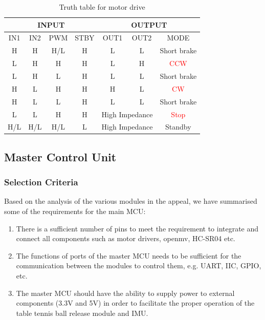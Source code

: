 \documentclass[12pt, a4paper, oneside]{report}
\begin{document}
\begin{table}[H]
    \centering
    \begin{tabular}{|c|c|c|c|c|c|c|}
    \hline
         \multicolumn{4}{|c|}{INPUT} & \multicolumn{3}{|c|}{OUTPUT} \\ \hline
        IN1 & IN2 & PWM & STBY & OUT1 & OUT2 & MODE \\ \hline
        H & H & H/L & H & L & L & Short brake \\ \hline
        L & H & H & H & L & H & \textcolor{red}{CCW}\\ \hline
        L & H & L & H & L & L & Short brake \\ \hline
        H & L & H & H & H & L & \textcolor{red}{CW} \\ \hline
        H & L & L & H & L & L & Short brake \\ \hline
        L & L & H & H & \multicolumn{2}{|c|}{High Impedance} & \textcolor{red}{Stop} \\ \hline
        H/L & H/L & H/L & L & \multicolumn{2}{|c|}{High Impedance}& Standby \\ \hline
    \end{tabular}
    \caption{Truth table for motor drive \cite{zzs1}}
    \label{tab:mt3}
\end{table}


\subsection{Master Control Unit}
\subsubsection{Selection Criteria}
Based on the analysis of the various modules in the appeal, we have summarised some of the requirements for the main MCU:
 \begin{enumerate}

\item  There is a sufficient number of pins to meet the requirement to integrate and connect all components such as motor drivers, openmv, HC-SR04 etc.
\item The functions of ports of the master MCU needs to be sufficient for the communication between the modules to control them, e.g. UART, IIC, GPIO, etc.
\item The master MCU should have the ability to supply power to external components (3.3V and 5V) in order to facilitate the proper operation of the table tennis ball release module and IMU.
\end{enumerate}
\end{document}
